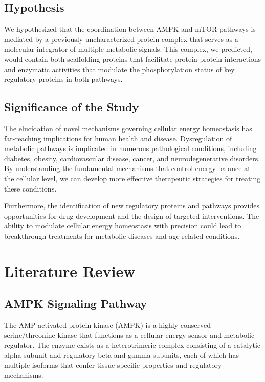 \documentclass[11pt,a4paper]{article}
\begin{document}
\subsection{Hypothesis}

We hypothesized that the coordination between AMPK and mTOR pathways is mediated by a previously uncharacterized protein complex that serves as a molecular integrator of multiple metabolic signals. This complex, we predicted, would contain both scaffolding proteins that facilitate protein-protein interactions and enzymatic activities that modulate the phosphorylation status of key regulatory proteins in both pathways.

\subsection{Significance of the Study}

The elucidation of novel mechanisms governing cellular energy homeostasis has far-reaching implications for human health and disease. Dysregulation of metabolic pathways is implicated in numerous pathological conditions, including diabetes, obesity, cardiovascular disease, cancer, and neurodegenerative disorders. By understanding the fundamental mechanisms that control energy balance at the cellular level, we can develop more effective therapeutic strategies for treating these conditions.

Furthermore, the identification of new regulatory proteins and pathways provides opportunities for drug development and the design of targeted interventions. The ability to modulate cellular energy homeostasis with precision could lead to breakthrough treatments for metabolic diseases and age-related conditions.

\section{Literature Review}

\subsection{AMPK Signaling Pathway}

The AMP-activated protein kinase (AMPK) is a highly conserved serine/threonine kinase that functions as a cellular energy sensor and metabolic regulator. The enzyme exists as a heterotrimeric complex consisting of a catalytic alpha subunit and regulatory beta and gamma subunits, each of which has multiple isoforms that confer tissue-specific properties and regulatory mechanisms.
\end{document}
